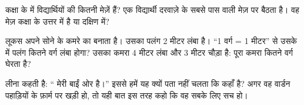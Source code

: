 \begin{exercise}[$\star\star$]\label{exo:g2:drawing-to-map:9}
कक्षा के  में विद्यार्थियों की कितनी मेज़ें हैं? एक विद्यार्थी दरवाज़े
के सबसे पास वाली मेज़ पर बैठता है। वह मेज़ कक्षा के उत्तर में है या दक्षिण में?
\end{exercise}

\begin{exercise}[$\star\star$]\label{exo:g2:drawing-to-map:10}
लूकस अपने सोने के कमरे का  बनाता है। उसका पलंग 2 मीटर लंबा है।
``1 वर्ग = 1 मीटर''  से उसके  में पलंग कितने वर्ग लंबा होगा?
उसका कमरा 4 मीटर लंबा और 3 मीटर चौड़ा है: पूरा कमरा कितने वर्ग घेरता है?
\end{exercise}

\begin{exercise}[$\star\star$]\label{exo:g2:drawing-to-map:11}
लीना कहती है: `` मेरी बाईं ओर है।'' इससे हमें यह क्यों पता नहीं चलता
कि  कहाँ है? अगर वह वार्डन पहाड़ियों के फ़ार्म पर खड़ी हो, तो यही बात
इस तरह कहो कि वह सबके लिए सच हो।
\end{exercise}
